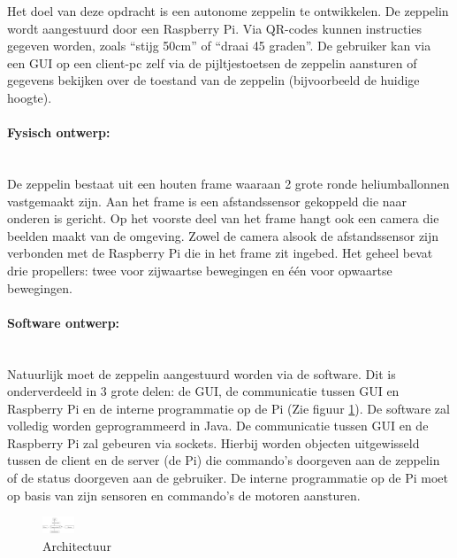 \documentclass{peno-opdracht1}
\begin{document}
\maketitle

Het doel van deze opdracht is een autonome zeppelin te ontwikkelen. De zeppelin wordt aangestuurd door een Raspberry Pi. Via QR-codes kunnen instructies gegeven worden, zoals ``stijg 50cm'' of ``draai 45   graden''. De gebruiker kan via een GUI op een client-pc zelf via de pijltjestoetsen de zeppelin aansturen of gegevens bekijken over de toestand van de zeppelin (bijvoorbeeld de huidige hoogte).

\paragraph{Fysisch ontwerp:}
~\\ 
De zeppelin bestaat uit een houten frame waaraan 2 grote ronde heliumballonnen vastgemaakt zijn. Aan het frame is een afstandssensor gekoppeld die naar onderen is gericht. Op het voorste deel van het frame hangt ook een camera die beelden maakt van de omgeving. Zowel de camera alsook de afstandssensor zijn verbonden met de Raspberry Pi die in het frame zit ingebed. Het geheel bevat drie propellers: twee voor zijwaartse bewegingen en \'{e}\'{e}n voor opwaartse bewegingen.


\paragraph{Software ontwerp:}
~\\
Natuurlijk moet de zeppelin aangestuurd worden via de software. Dit is onderverdeeld in 3 grote delen: de GUI, de communicatie tussen GUI en Raspberry Pi en de interne programmatie op de Pi (Zie figuur \ref{schema}). De software zal volledig worden geprogrammeerd in Java. 
De communicatie tussen GUI en de Raspberry Pi zal gebeuren via sockets. Hierbij worden objecten uitgewisseld tussen de client en de server (de Pi) die commando's doorgeven aan de zeppelin of de status doorgeven aan de gebruiker. De interne programmatie op de Pi moet op basis van zijn sensoren en commando's de motoren aansturen. 




\begin{figure}[ht!]
\centering
\includegraphics[height=5mm]{Schema.jpg}
\caption{Architectuur}
\label{schema}
\end{figure}
\end{document}
